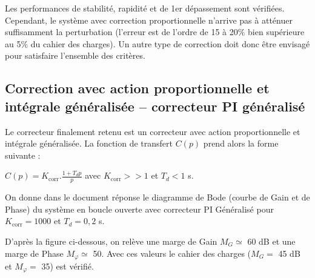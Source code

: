 \begin{multicols}{2}
\begin{center}
\end{center}
\fi

\ifprof
\begin{corrige}
Les performances de stabilité, rapidité et de 1er dépassement sont vérifiées. Cependant, le système avec correction proportionnelle n'arrive pas à atténuer suffisamment la perturbation (l'erreur est de l'ordre de 15 à 20$\%$ bien supérieure au 5$\%$ du cahier des charges). Un autre type de correction doit donc être envisagé pour satisfaire l'ensemble des critères.\end{corrige}
\fi


\ifprof
\else
\subsection*{Correction avec action proportionnelle et intégrale généralisée -- correcteur PI généralisé}


Le correcteur finalement retenu est un correcteur avec action proportionnelle et intégrale généralisée. La fonction de transfert $C(p)$ prend alors la forme suivante :

{\centering
$C(p)= K_{\text{corr}} . \frac{1+T_d p}{p}$  avec $K_{\text{corr}} >> 1$ et $T_d < 1$ s.
\par}
On donne dans le document réponse le diagramme de Bode (courbe de Gain et de Phase) du système en boucle ouverte avec correcteur PI Généralisé pour $K_{\text{corr}} = \num{1000}$ et $T_d = 0,2$ s. 
\fi


\ifprof
\begin{corrige}
D'après la figure ci-dessous, on relève une marge de Gain $M_G \simeq$ 60 dB et une marge de Phase $M_{\varphi} \simeq$ 50\degre. Avec ces valeurs le cahier des charges ($M_G =$ 45 dB et $M_{\varphi} =$ 35\degre) est vérifié.
 

\end{corrige}
\end{multicols}
